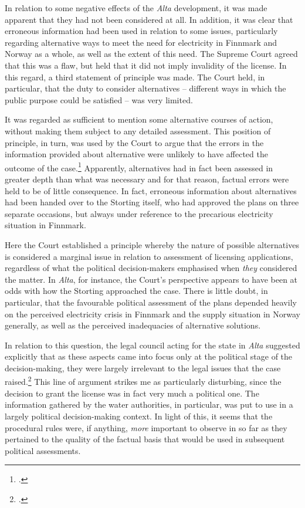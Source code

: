 In relation to some negative effects of the {\it Alta} development, it was made apparent that they had not been considered at all. In addition, it was clear that erroneous information had been used in relation to some issues, particularly regarding alternative ways to meet the need for electricity in Finnmark and Norway as a whole, as well as the extent of this need. The Supreme Court agreed that this was a flaw, but held that it did not imply invalidity of the license. In this regard, a third statement of principle was made. The Court held, in particular, that the duty to consider alternatives -- different ways in which the public purpose could be satisfied -- was very limited.

It was regarded as sufficient to mention some alternative courses of action, without making them subject to any detailed assessment. This position of principle, in turn, was used by the Court to argue that the errors in the information provided about alternative were unlikely to have affected the outcome of the case.\footcite[346]{alta82} Apparently, alternatives had in fact been assessed in greater depth than what was necessary and for that reason, factual errors were held to be of little consequence. In fact, erroneous information about alternatives had been handed over to the Storting itself, who had approved the plans on three separate occasions, but always under reference to the precarious electricity situation in Finnmark.

Here the Court established a principle whereby the nature of possible alternatives is considered a marginal issue in relation to assessment of licensing applications, regardless of what the political decision-makers emphasised when {\it they} considered the matter. In {\it Alta}, for instance, the Court's perspective appears to have been at odds with how the Storting approached the case. There is little doubt, in particular, that the favourable political assessment of the plans depended heavily on the perceived electricity crisis in Finnmark and the supply situation in Norway generally, as well as the perceived inadequacies of alternative solutions.

In relation to this question, the legal council acting for the state in {\it Alta} suggested explicitly that as these aspects came into focus only at the political stage of the decision-making, they were largely irrelevant to the legal issues that the case raised.\footcite[341]{alta82} This line of argument strikes me as particularly disturbing, since the decision to grant the license was in fact very much a political one. The information gathered by the water authorities, in particular, was put to use in a largely political decision-making context. In light of this, it seems that the procedural rules were, if anything, {\it more} important to observe in so far as they pertained to the quality of the factual basis that would be used in subsequent political assessments.

